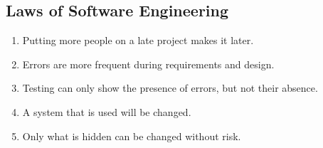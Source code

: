 
\subsection{Laws of Software Engineering}

\begin{enumerate}
  \item Putting more people on a late project makes it later.
  \item Errors are more frequent during requirements and design.
  \item Testing can only show the presence of errors, but not their absence.
  \item A system that is used will be changed.
  \item Only what is hidden can be changed without risk.
\end{enumerate}

